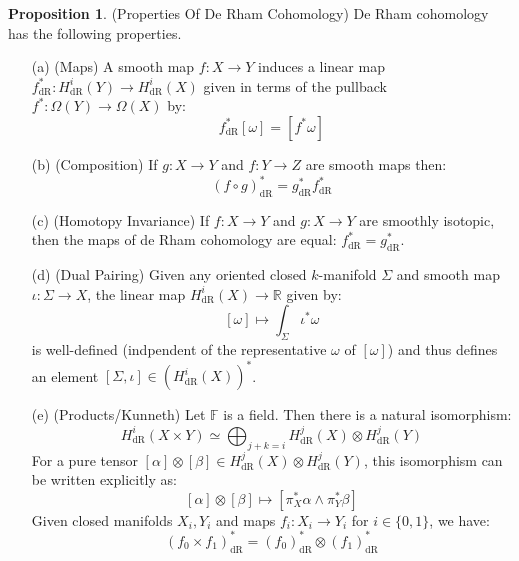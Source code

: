 \documentclass[12pt]{article}
\theoremstyle{definition}
\newtheorem{proposition}[theorem]{Proposition}
\numberwithin{equation}{section}
\newcommand{\R}{{\mathbb R}}
\newcommand{\op}{\operatorname}
\begin{document}
\begin{proposition} \label{prop:de_rham_homology_properties} (Properties Of De Rham Cohomology) De Rham cohomology has the following properties.
\begin{itemize}
	\item[(a)] (Maps) A smooth map $f:X \to Y$ induces a linear map $f^*_{\op{dR}}:H^i_{\op{dR}}(Y) \to H^i_{\op{dR}}(X)$ given in terms of the pullback $f^*:\Omega(Y) \to \Omega(X)$ by:
	\[f^*_{\op{dR}}[\omega] = [f^*\omega]\]
	\item[(b)] (Composition) If $g:X \to Y$ and $f:Y \to Z$ are smooth maps then:
	\[(f \circ g)_{\op{dR}}^* = g_{\op{dR}}^*f_{\op{dR}}^*\]
	\item[(c)] (Homotopy Invariance) If $f:X \to Y$ and $g:X \to Y$ are smoothly isotopic, then the maps of de Rham cohomology are equal: $f_{\op{dR}}^* = g_{\op{dR}}^*$.
	\item[(d)] (Dual Pairing) Given any oriented closed $k$-manifold $\Sigma$ and smooth map $\iota:\Sigma \to X$, the linear map $H^i_{\op{dR}}(X) \to \R$ given by:
	\[[\omega] \mapsto \int_{\Sigma} \iota^*\omega\]
	is well-defined (indpendent of the representative $\omega$ of $[\omega]$) and thus defines an element $[\Sigma,\iota] \in (H^i_{\op{dR}}(X))^*$.
	\item[(e)] (Products/Kunneth) Let $\mathbb{F}$ is a field. Then there is a natural isomorphism:
	\[
	H_{\op{dR}}^i(X \times Y) \simeq \bigoplus_{j + k = i} H^j_{\op{dR}}(X) \otimes H^j_{\op{dR}}(Y)
	\]
	For a pure tensor $[\alpha] \otimes [\beta] \in H^j_{\op{dR}}(X) \otimes H^j_{\op{dR}}(Y)$, this isomorphism can be written explicitly as:
	\[
	[\alpha] \otimes [\beta] \mapsto [\pi^*_X\alpha \wedge \pi^*_Y\beta]
	\]
	Given closed manifolds $X_i,Y_i$ and maps $f_i:X_i \to Y_i$ for $i \in \{0,1\}$, we have:
	\[
	(f_0 \times f_1)_{\op{dR}}^* = (f_0)_{\op{dR}}^* \otimes (f_1)_{\op{dR}}^*
	\]
	\end{itemize}
\end{proposition}
\end{document}
